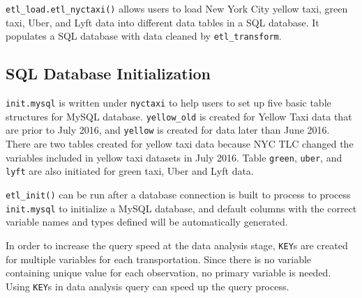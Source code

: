 \documentclass[12pt,twoside]{reedthesis}
\newenvironment{Shaded}{\begin{snugshade}}{\end{snugshade}}
\newcommand{\KeywordTok}[1]{\textcolor[rgb]{0.13,0.29,0.53}{\textbf{#1}}}
\newcommand{\DataTypeTok}[1]{\textcolor[rgb]{0.13,0.29,0.53}{#1}}
\newcommand{\DecValTok}[1]{\textcolor[rgb]{0.00,0.00,0.81}{#1}}
\newcommand{\StringTok}[1]{\textcolor[rgb]{0.31,0.60,0.02}{#1}}
\newcommand{\OperatorTok}[1]{\textcolor[rgb]{0.81,0.36,0.00}{\textbf{#1}}}
\newcommand{\NormalTok}[1]{#1}
\theoremstyle{definition}
\theoremstyle{definition}
\theoremstyle{definition}
\theoremstyle{remark}
\begin{document}
\texttt{etl\_load.etl\_nyctaxi()} allows users to load New York City
yellow taxi, green taxi, Uber, and Lyft data into different data tables
in a SQL database. It populates a SQL database with data cleaned by
\texttt{etl\_transform}.
\begin{Shaded}
\end{Shaded}
\subsection{SQL Database
Initialization}\label{sql-database-initialization}

\texttt{init.mysql} is written under \texttt{nyctaxi} to help users to
set up five basic table structures for MySQL database.
\texttt{yellow\_old} is created for Yellow Taxi data that are prior to
July 2016, and \texttt{yellow} is created for data later than June 2016.
There are two tables created for yellow taxi data because NYC TLC
changed the variables included in yellow taxi datasets in July 2016.
Table \texttt{green}, \texttt{uber}, and \texttt{lyft} are also
initiated for green taxi, Uber and Lyft data.

\texttt{etl\_init()} can be run after a database connection is built to
process to process \texttt{init.mysql} to initialize a MySQL database,
and default columns with the correct variable names and types defined
will be automatically generated.
\begin{Shaded}
\end{Shaded}
In order to increase the query speed at the data analysis stage,
\texttt{KEY}s are created for multiple variables for each
transportation. Since there is no variable containing unique value for
each observation, no primary variable is needed. Using \texttt{KEY}s in
data analysis query can speed up the query process.
\end{document}
